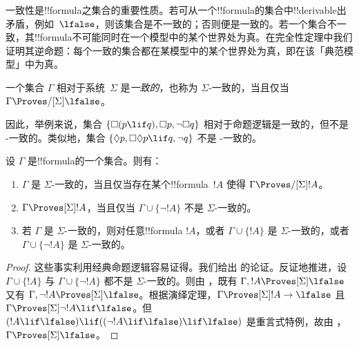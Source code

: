 \documentclass[../../../include/open-logic-section]{subfiles}
\begin{document}


一致性是!!{formula}之集合的重要性质。若可从一个!!{formula}的集合中!!{derivable}出矛盾，例如~$\lfalse$，则该集合是不一致的；否则便是一致的。若一个集合不一致，其!!{formula}不可能同时在一个模型中的某个世界处为真。在完全性定理中我们证明其逆命题：每个一致的集合都在某模型中的某个世界处为真，即在该「典范模型」中为真。

\begin{defn}
  一个集合 $\Gamma$ 相对于系统~$\Sigma$ 是\emph{一致的}，也称为 $\Sigma$-一致的，当且仅当 $\Gamma \Proves/[\Sigma] \lfalse$。
\end{defn}

因此，举例来说，集合 $\{ \Box(p \lif q), \Box p, \lnot\Box q \}$ 相对于命题逻辑是一致的，但不是 -一致的。类似地，集合 $\{ \Diamond p, \Box\Diamond p \lif q, \lnot q \}$ 不是 -一致的。

\begin{prop}
  设 $\Gamma$ 是!!{formula}的一个集合。则有：
  \begin{enumerate}
  \item $\Gamma$ 是 $\Sigma$-一致的，当且仅当存在某个!!{formula}~$!A$ 使得 $\Gamma \Proves/[\Sigma] !A$。
  \item {}%
    $\Gamma \Proves[\Sigma] !A$，当且仅当 $\Gamma \cup \{ \lnot!A \}$ 不是 $\Sigma$-一致的。
  \item {}%
    若 $\Gamma$ 是 $\Sigma$-一致的，则对任意!!{formula} $!A$，或者 $\Gamma \cup \{ !A \}$ 是 $\Sigma$-一致的，或者 $\Gamma \cup \{ \lnot!A \}$ 是 $\Sigma$-一致的。
  \end{enumerate}
\end{prop}

\begin{proof}
  这些事实利用经典命题逻辑容易证得。我们给出  的论证。反证地推进，设 $\Gamma \cup \{ !A \}$ 与 $\Gamma \cup \{ \lnot!A \}$ 都不是 $\Sigma$-一致的。则由 ，既有 $\Gamma, !A \Proves[\Sigma] \lfalse$ 又有 $\Gamma, \lnot !A \Proves[\Sigma] \lfalse$。根据演绎定理，$\Gamma \Proves[\Sigma] !A \to \lfalse$ 且 $\Gamma \Proves[\Sigma] \lnot!A \lif \lfalse$。但 $(!A \lif \lfalse) \lif ((\lnot!A \lif \lfalse) \lif \lfalse)$ 是重言式特例，故由 ，$\Gamma \Proves[\Sigma] \lfalse$。
\end{proof}
\end{document}
